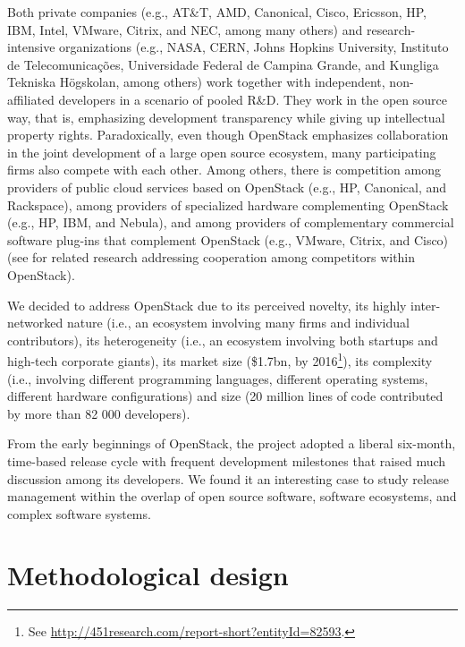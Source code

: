 \documentclass[dvipsnames]{bmcart}
\theoremstyle{definition}
\begin{document}
Both private companies (e.g.,  AT\&T, AMD, Canonical, Cisco, Ericsson, HP, IBM, Intel, VMware, Citrix, and NEC,  among many others) and research-intensive organizations (e.g., NASA, CERN, Johns Hopkins University, Instituto de Telecomunicações, Universidade Federal de Campina Grande, and Kungliga Tekniska Högskolan, among  others)  work  together with independent, non-affiliated developers in a scenario of pooled  \ac{R&D}. 
They work in the open source way, that is, emphasizing development transparency while giving up intellectual property rights. Paradoxically, even though OpenStack emphasizes collaboration in the joint development of a large open source ecosystem, many participating firms also compete  with each other. %
Among others, there is competition among providers of public cloud services based on OpenStack (e.g., HP, Canonical, and Rackspace), among providers of specialized hardware complementing OpenStack (e.g., HP, IBM, and Nebula), and among providers of complementary commercial software plug-ins that complement OpenStack (e.g., VMware, Citrix, and Cisco) (see \cite{teixeira_et_al_icis2016,teixeira2015lessons} for related research addressing cooperation among competitors within OpenStack). 

We decided to address OpenStack due to its perceived novelty, its highly inter-networked nature (i.e., an ecosystem involving many firms and individual contributors), its heterogeneity (i.e., an ecosystem involving both startups and high-tech corporate giants), its market size (\$1.7bn, by 2016\footnote{See \url{http://451research.com/report-short?entityId=82593}.}), its complexity (i.e., involving different programming languages, different operating systems, different hardware configurations) and size (20 million lines of code contributed by more than 82 000 developers). 

From the early beginnings of OpenStack, the project  adopted a liberal six-month, time-based release cycle with frequent development milestones that raised much discussion among its developers. We found it an interesting case to study release management within the overlap of open source software, software ecosystems, and complex software systems. 

\section{Methodological design}
\label{sec:method}
\end{document}
